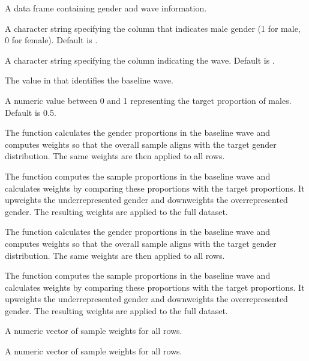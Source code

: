 \documentclass[a4paper]{book}
\begin{document}
%
\begin{Arguments}
\begin{ldescription}
\item[\code{data}] A data frame containing gender and wave information.

\item[\code{male\_col}] A character string specifying the column that indicates male gender (1 for male, 0 for female). Default is .

\item[\code{wave\_col}] A character string specifying the column indicating the wave. Default is .

\item[\code{target\_wave}] The value in  that identifies the baseline wave.

\item[\code{target\_male\_prop}] A numeric value between 0 and 1 representing the target proportion of males. Default is 0.5.
\end{ldescription}
\end{Arguments}
%
\begin{Details}
The function calculates the gender proportions in the baseline wave and computes weights so that
the overall sample aligns with the target gender distribution. The same weights are then applied to all rows.


The function computes the sample proportions in the baseline wave and calculates weights by comparing these
proportions with the target proportions. It upweights the underrepresented gender and downweights the overrepresented gender.
The resulting weights are applied to the full dataset.

The function calculates the gender proportions in the baseline wave and computes weights so that
the overall sample aligns with the target gender distribution. The same weights are then applied to all rows.


The function computes the sample proportions in the baseline wave and calculates weights by comparing these
proportions with the target proportions. It upweights the underrepresented gender and downweights the overrepresented gender.
The resulting weights are applied to the full dataset.
\end{Details}
%
\begin{Value}
A numeric vector of sample weights for all rows.

A numeric vector of sample weights for all rows.
\end{Value}
\end{document}
